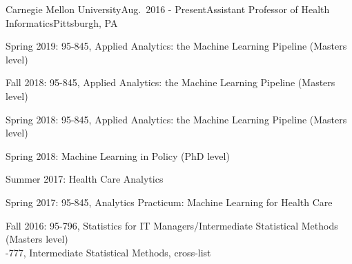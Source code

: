 \begin{rSubsection}{Carnegie Mellon University}{Aug.\ 2016 - Present}{Assistant Professor of Health Informatics}{Pittsburgh, PA}
\item Spring 2019: 95-845, Applied Analytics: the Machine Learning Pipeline (Masters level)
\item Fall 2018: 95-845, Applied Analytics: the Machine Learning Pipeline (Masters level)
\item Spring 2018: 95-845, Applied Analytics: the Machine Learning Pipeline (Masters level)
\item Spring 2018: Machine Learning in Policy (PhD level)
\item Summer 2017: Health Care Analytics
\item Spring 2017: 95-845, Analytics Practicum: Machine Learning for Health Care
\item Fall 2016: 95-796, Statistics for IT Managers/Intermediate Statistical Methods (Masters level)
  \\ -777, Intermediate Statistical Methods, cross-list
\end{rSubsection}




